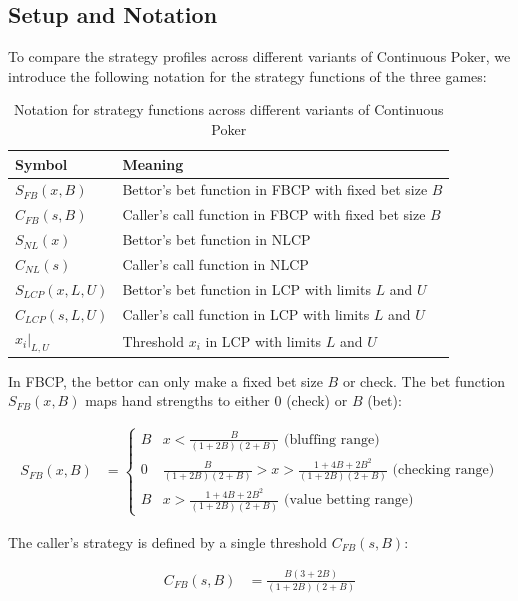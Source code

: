 \documentclass[a4paper,12pt]{article}
\theoremstyle{plain}
\theoremstyle{definition}
\begin{document}
\subsection{Setup and Notation}

To compare the strategy profiles across different variants of Continuous Poker, we introduce the following notation for the strategy functions of the three games:

\begin{table}[h]
\centering
\begin{tabular}{|l|l|}
\hline
\textbf{Symbol} & \textbf{Meaning} \\
\hline
$S_{FB}(x, B)$ & Bettor's bet function in FBCP with fixed bet size $B$ \\
$C_{FB}(s, B)$ & Caller's call function in FBCP with fixed bet size $B$ \\
$S_{NL}(x)$ & Bettor's bet function in NLCP \\
$C_{NL}(s)$ & Caller's call function in NLCP \\
$S_{LCP}(x, L, U)$ & Bettor's bet function in LCP with limits $L$ and $U$ \\
$C_{LCP}(s, L, U)$ & Caller's call function in LCP with limits $L$ and $U$ \\
$x_i|_{L,U}$ & Threshold $x_i$ in LCP with limits $L$ and $U$ \\
\hline
\end{tabular}
\caption{Notation for strategy functions across different variants of Continuous Poker}
\label{tab:notation}
\end{table}

In FBCP, the bettor can only make a fixed bet size $B$ or check. The bet function $S_{FB}(x, B)$ maps hand strengths to either $0$ (check) or $B$ (bet):

\begin{align}
	S_{FB}(x, B) & = \begin{cases}
    B & x < \frac{B}{(1+2B)(2+B)} \text{ (bluffing range)}\\
    0 & \frac{B}{(1+2B)(2+B)} > x > \frac{1 + 4B + 2B^2}{(1+2B)(2+B)} \text{ (checking range)}\\
    B & x > \frac{1 + 4B + 2B^2}{(1+2B)(2+B)} \text{ (value betting range)}
\end{cases}
\end{align}

The caller's strategy is defined by a single threshold $C_{FB}(s, B)$:

\begin{align}
C_{FB}(s, B) & = \frac{B(3 +2B)}{(1+2B)(2+B)}
\end{align}
\end{document}
